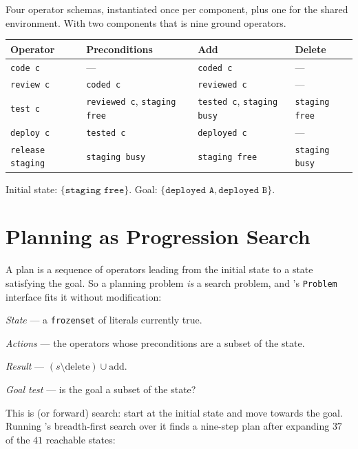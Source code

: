 \begin{examplebox}
Four operator schemas, instantiated once per component, plus one for the shared
environment. With two components that is nine ground operators.

\smallskip
\noindent\begin{tabular}{@{}L{2.7cm}L{4.3cm}L{3.9cm}L{2.7cm}@{}}
\toprule
\textbf{Operator} & \textbf{Preconditions} & \textbf{Add} & \textbf{Delete} \\
\midrule
\texttt{code c} & --- & \texttt{coded c} & --- \\
\texttt{review c} & \texttt{coded c} & \texttt{reviewed c} & --- \\
\texttt{test c} & \texttt{reviewed c}, \texttt{staging free} &
\texttt{tested c}, \texttt{staging busy} & \texttt{staging free} \\
\texttt{deploy c} & \texttt{tested c} & \texttt{deployed c} & --- \\
\texttt{release staging} & \texttt{staging busy} & \texttt{staging free} &
\texttt{staging busy} \\
\bottomrule
\end{tabular}

\smallskip
Initial state: $\{\texttt{staging free}\}$. Goal:
$\{\texttt{deployed A}, \texttt{deployed B}\}$.
\end{examplebox}

\section{Planning as Progression Search}

A plan is a sequence of operators leading from the initial state to a state
satisfying the goal. So a planning problem \emph{is} a search problem, and
's \texttt{Problem} interface fits it without modification:

\begin{tight}
  \item \emph{State} --- a \texttt{frozenset} of literals currently true.
  \item \emph{Actions} --- the operators whose preconditions are a subset of the
        state.
  \item \emph{Result} --- $(s \setminus \mathrm{delete}) \cup \mathrm{add}$.
  \item \emph{Goal test} --- is the goal a subset of the state?
\end{tight}

This is  (or forward) search: start at the initial state and move
towards the goal. Running 's breadth-first search over it finds a
nine-step plan after expanding $37$ of the $41$ reachable states:

